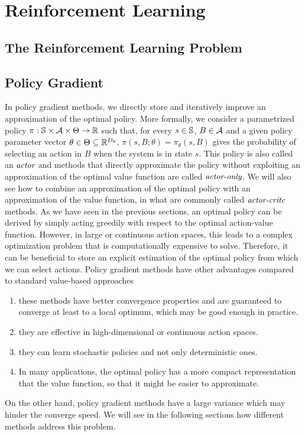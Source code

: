 \chapter{Reinforcement Learning}

\section{The Reinforcement Learning Problem}

\section{Policy Gradient}
In policy gradient methods, we directly store and iteratively improve an 
approximation of the optimal policy. More formally, we consider a parametrized
policy $\pi: \S \times \calA \times \Theta \to \R$ such that, for every $s \in
\S$, $B \in \calA$ and a given policy parameter vector $\theta \in \Theta
\subseteq \R^{D_\theta}$, $\pi(s, B; \theta) = \pi_\theta(s, B)$ gives the
probability of selecting an action in $B$ when the system is in state $s$. This
policy is also called an $\emph{actor}$ and methods that directly approximate
the policy without exploiting an approximation of the optimal value function are 
called $\emph{actor-only}$. We will also see how to combine an approximation of 
the optimal policy with an approximation of the value function, in what are
commonly called $\emph{actor-critc}$ methods. As we have seen in the previous
sections, an optimal policy can be derived by simply acting greedily with
respect to the optimal action-value function. However, in large or continuous 
action spaces, this leads to a complex optimization problem that is 
computationally expensive to solve. Therefore, it can be beneficial to store an
explicit estimation of the optimal policy from which we can select actions.
Policy gradient methods have other advantages compared to standard value-based
approaches
\begin{enumerate}[label={\roman*)}]
	\item these methods have better convergence properties and are guaranteed
		to converge at least to a local optimum, which may be good enough in
		practice.  
	\item they are effective in high-dimensional or continuous action spaces.
	\item they can learn stochastic policies and not only deterministic ones.
	\item In many applications, the optimal policy has a more compact
		representation that the value function, so that it might be easier to
		approximate. 
\end{enumerate}
On the other hand, policy gradient methods have a large variance which may
hinder the converge speed. We will see in the following sections how different 
methods address this problem.  

